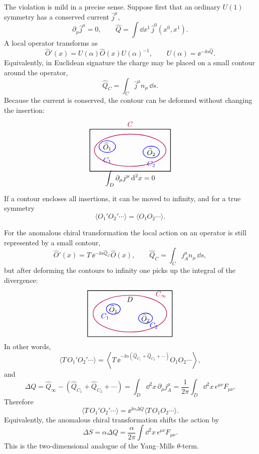 The violation is mild in a precise sense.  Suppose first that an ordinary
\(U(1)\) symmetry has a conserved current \(\widehat j^\mu\),
\[
  \partial_\mu\widehat j^\mu=0,
  \qquad
  \widehat Q=\int\dd x^1\,\widehat j^0(x^0,x^1).
\]
A local operator transforms as
\[
  \widehat O'(x)
  =
  U(\alpha)\widehat O(x)U(\alpha)^{-1},
  \qquad
  U(\alpha)=\ee^{-\ii\alpha\widehat Q}.
\]
Equivalently, in Euclidean signature the charge may be placed on a small
contour around the operator,
\[
  \widehat Q_C=\int_C\widehat j^\mu n_\mu\,\dd s.
\]
Because the current is conserved, the contour can be deformed without
changing the insertion:
\[
\begin{tikzpicture}[>=Stealth,scale=0.92,baseline={(0,-0.15)}]
  \draw[thick] (-2.2,-1.15) rectangle (2.2,1.15);
  \node at (-1.25,0.2) {\(\widehat O_1\)};
  \node at (1.15,-0.1) {\(\widehat O_2\)};
  \draw[blue,thick,->] (-1.25,0.2) ellipse (0.45 and 0.32);
  \draw[blue,thick,->] (1.15,-0.1) ellipse (0.45 and 0.32);
  \draw[purple,thick,->] (0,0) ellipse (1.95 and 0.88);
  \node[blue] at (-1.25,-0.55) {\(C_1\)};
  \node[blue] at (1.15,-0.75) {\(C_2\)};
  \node[purple] at (0,1.42) {\(C\)};
  \node at (0,-1.55) {\(\displaystyle
    \int_D\partial_\mu j^\mu\,\dd^2x=0\)};
\end{tikzpicture}
\]
If a contour encloses all insertions, it can be moved to infinity, and
for a true symmetry
\[
  \langle O_1'O_2'\cdots\rangle
  =
  \langle O_1O_2\cdots\rangle .
\]

For the anomalous chiral transformation the local action on an operator
is still represented by a small contour,
\[
  \widehat O'(x)=
  T\,\ee^{-\ii\alpha\widehat Q_C}\widehat O(x),
  \qquad
  \widehat Q_C=\int_C j_A^\mu n_\mu\,\dd s,
\]
but after deforming the contours to infinity one picks up the integral of
the divergence:
\[
\begin{tikzpicture}[>=Stealth,scale=0.92,baseline={(0,-0.15)}]
  \draw[thick] (-2.3,-1.25) rectangle (2.3,1.25);
  \draw[purple,thick,->] (0,0) ellipse (2.0 and 1.0);
  \draw[blue,thick,->] (-0.9,0.25) ellipse (0.38 and 0.28);
  \draw[blue,thick,->] (0.85,-0.25) ellipse (0.38 and 0.28);
  \node at (-0.9,0.25) {\(\widehat O_1\)};
  \node at (0.85,-0.25) {\(\widehat O_2\)};
  \node[purple] at (1.7,1.05) {\(C_\infty\)};
  \node[blue] at (-1.35,-0.15) {\(C_1\)};
  \node[blue] at (1.3,-0.65) {\(C_2\)};
  \node at (0,0.78) {\(D\)};
\end{tikzpicture}
\]
In other words,
\[
  \langle T\,O_1'O_2'\cdots\rangle
  =
  \left\langle
    T\,\ee^{-\ii\alpha(\widehat Q_{C_1}+\widehat Q_{C_2}+\cdots)}
    O_1O_2\cdots
  \right\rangle ,
\]
and
\[
  \Delta Q
  =
  \widehat Q_\infty-(\widehat Q_{C_1}+\widehat Q_{C_2}+\cdots)
  =
  \int_D\dd^2x\,\partial_\mu j_A^\mu
  =
  \frac1{2\pi}\int_D\dd^2x\,\epsilon^{\mu\nu}F_{\mu\nu}.
\]
Therefore
\[
  \langle T\,O_1'O_2'\cdots\rangle
  =
  \ee^{\ii\alpha\Delta Q}
  \langle T\,O_1O_2\cdots\rangle .
\]
Equivalently, the anomalous chiral transformation shifts the action by
\[
  \Delta S=\alpha\Delta Q
  =
  \frac{\alpha}{2\pi}
  \int\dd^2x\,\epsilon^{\mu\nu}F_{\mu\nu}.
\]
This is the two-dimensional analogue of the Yang--Mills \(\theta\)-term.

